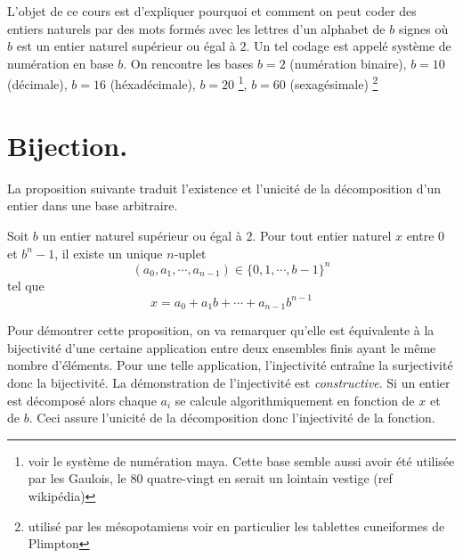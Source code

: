 



L'objet de ce cours est d'expliquer pourquoi et comment on peut coder des entiers naturels par des mots formés avec les lettres d'un alphabet de $b$ signes où $b$ est un entier naturel supérieur ou égal à $2$. Un tel codage est appelé système de numération en base $b$.\newline
On rencontre les bases $b=2$ (numération binaire), $b=10$ (décimale), $b=16$ (héxadécimale), $b=20$ \footnote{voir le système de numération maya. Cette base semble aussi avoir été utilisée par les Gaulois, le 80 quatre-vingt en serait un lointain vestige (ref wikipédia) }, $b=60$ (sexagésimale) \footnote{utilisé par les mésopotamiens voir en particulier les tablettes cuneiformes de Plimpton}
\section{Bijection.}
La proposition suivante traduit l'existence et l'unicité de la décomposition d'un entier dans une base arbitraire. 
\begin{prop}
 Soit $b$ un entier naturel supérieur ou égal à $2$. Pour tout entier naturel $x$ entre $0$ et $b^n-1$, il existe un unique $n$-uplet
\begin{displaymath}
 (a_0,a_1,\cdots,a_{n-1})\in \{0,1,\cdots,b-1\}^n
\end{displaymath}
tel que 
\begin{displaymath}
 x = a_0 + a_1 b +\cdots +a_{n-1}b^{n-1}
\end{displaymath}
\end{prop}

 Pour démontrer cette proposition, on va remarquer qu'elle est équivalente à la bijectivité d'une certaine application entre deux ensembles finis ayant le même nombre d'éléments. Pour une telle application, l'injectivité entraîne la surjectivité donc la bijectivité.\newline
La démonstration de l'injectivité est \emph{constructive}. Si un entier est décomposé alors chaque $a_i$ se calcule algorithmiquement en fonction de $x$ et de $b$. Ceci assure l'unicité de la décomposition donc l'injectivité de la fonction.

